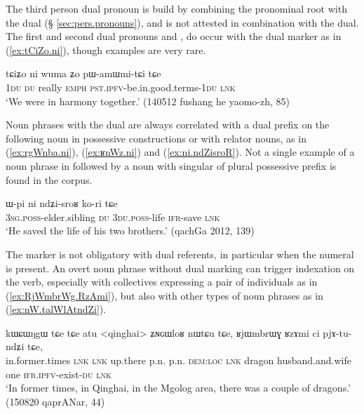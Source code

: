 The third person dual pronoun  is build by combining the pronominal root  with the dual  (§ \ref{sec:pers.pronouns}), and is not attested in combination with the dual. The first and second dual pronouns  and , do occur with the dual marker as in (\ref{ex:tCiZo.ni}), though examples are very rare.

\begin{exe}
\ex \label{ex:tCiZo.ni}
\gll  tɕiʑo ni wuma ʑo pɯ-amɯmi-tɕi tɕe \\
\textsc{1du} \textsc{du} really \textsc{emph} \textsc{pst}.\textsc{ipfv}-be.in.good.terms-\textsc{1du} \textsc{lnk} \\
\glt `We were in harmony together.' (140512 fushang he yaomo-zh, 85)
\end{exe}

Noun phrases with the dual  are always correlated with a dual prefix on the following noun in possessive constructions or with relator nouns, as in (\ref{ex:rgWnba.ni}), (\ref{ex:ʁnWz.ni}) and (\ref{ex:ni.ndZisroR}). Not a single example of a noun phrase in  followed by a noun with singular of plural possessive prefix is found in the corpus.

\begin{exe}
\ex \label{ex:ni.ndZisroR} 
\gll ɯ-pi ni ndʑi-sroʁ ko-ri tɕe \\
\textsc{3sg}.\textsc{poss}-elder.sibling \textsc{du} \textsc{3du}.\textsc{poss}-life \textsc{ifr}-save \textsc{lnk} \\
\glt `He saved the life of his two brothers.' (qachGa 2012, 139)
\end{exe}

The marker  is not obligatory with dual referents, in particular when the numeral  is present. An overt noun phrase without dual marking can trigger indexation on the verb, especially with collectives expressing a pair of individuals as  in (\ref{ex:RjWmbrWg.RzAmi}), but also with other types of noun phrases as in (\ref{ex:nW.talWlAtndZi}).

\begin{exe}
\ex \label{ex:RjWmbrWg.RzAmi}
\gll  kɯɕɯŋgɯ tɕe tɕe atu <qinghai> ʑɴɢɯloʁ nɯtɕu tɕe, ʁjɯmbrɯɣ ʁzɤmi ci pjɤ-tu-ndʑi tɕe,  \\
in.former.times \textsc{lnk}  \textsc{lnk} up.there p.n. p.n. \textsc{dem}:\textsc{loc} \textsc{lnk} dragon husband.and.wife one \textsc{ifr}.\textsc{ipfv}-exist-\textsc{du} \textsc{lnk} \\
\glt `In former times, in Qinghai, in the Mgolog area, there was a couple of dragons.' (150820 qaprANar, 44)
\end{exe}

